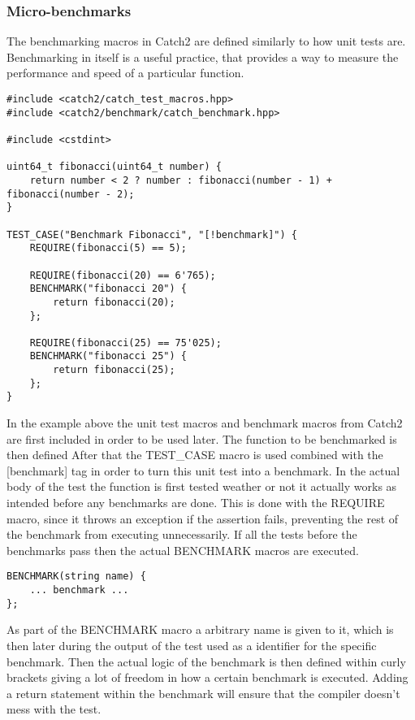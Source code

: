 \subsubsection{Micro-benchmarks}
The benchmarking macros in Catch2 are defined similarly to how unit tests are. Benchmarking in itself is a useful practice, that provides a way to measure the performance
and speed of a particular function.

\begin{verbatim}
#include <catch2/catch_test_macros.hpp>
#include <catch2/benchmark/catch_benchmark.hpp>

#include <cstdint>

uint64_t fibonacci(uint64_t number) {
    return number < 2 ? number : fibonacci(number - 1) + fibonacci(number - 2);
}

TEST_CASE("Benchmark Fibonacci", "[!benchmark]") {
    REQUIRE(fibonacci(5) == 5);

    REQUIRE(fibonacci(20) == 6'765);
    BENCHMARK("fibonacci 20") {
        return fibonacci(20);
    };

    REQUIRE(fibonacci(25) == 75'025);
    BENCHMARK("fibonacci 25") {
        return fibonacci(25);
    };
}
\end{verbatim}

In the example above the unit test macros and benchmark macros from Catch2 are first included in order to be used later. The function to be benchmarked is then defined
After that the TEST\_CASE macro is used combined with the [\!benchmark] tag in order to turn this unit test into a benchmark. In the actual body of the test the function
is first tested weather or not it actually works as intended before any benchmarks are done. This is done with the REQUIRE macro, since it throws an exception if the 
assertion fails, preventing the rest of the benchmark from executing unnecessarily. If all the tests before the benchmarks pass then the actual BENCHMARK macros are
executed.

\begin{verbatim}
BENCHMARK(string name) {
    ... benchmark ...
};
\end{verbatim}

As part of the BENCHMARK macro a arbitrary name is given to it, which is then later during the output of the test used as a identifier for the specific benchmark.
Then the actual logic of the benchmark is then defined within curly brackets giving a lot of freedom in how a certain benchmark is executed. Adding a return statement
within the benchmark will ensure that the compiler doesn't mess with the test.

